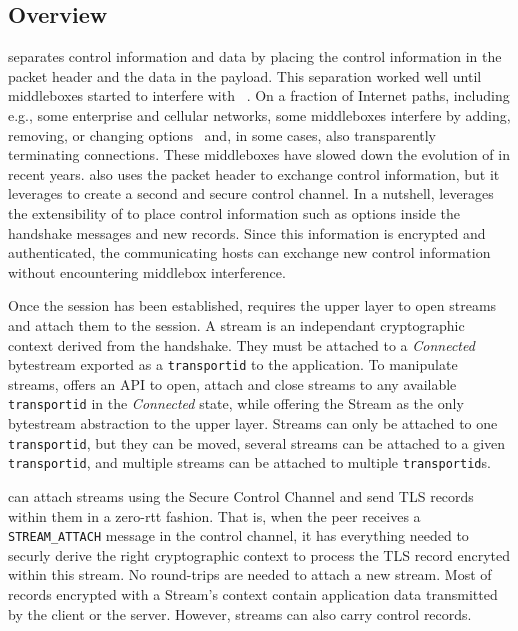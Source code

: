 \subsection{Overview}

\tcp separates control information and data by placing the control information
in the packet header and the data in the payload. This separation worked well
until middleboxes started to interfere with \tcp~\cite{10.1145/1064413.1064418,
  honda2011still, DHBVD13}.  On a fraction of Internet paths, including e.g.,
some enterprise and cellular networks, some middleboxes interfere by adding,
removing, or changing \tcp options~\cite{wang2011untold, honda2011still,
  xu2015investigating} and, in some cases, also transparently terminating \tcp
connections. These middleboxes have slowed down the evolution of \tcp in recent
years. \tcpls also uses the packet header to exchange \tcp control information,
but it leverages \tls to create a second and secure control channel. In a
nutshell, \tcpls leverages the extensibility of  to place control
information such as \tcp options inside the \tls handshake messages and new \tls
records. Since this information is encrypted and authenticated, the
communicating hosts can exchange new control information without encountering
middlebox interference.

Once the \tcpls session has been established, \tcpls requires the upper layer to
open streams and attach them to the session. A stream is an independant
cryptographic context derived from the \tcpls handshake. They must be attached to a \textit{Connected} \tcp bytestream exported as a \texttt{transportid} to the application. To manipulate streams, \tcpls offers an API to open, attach
and close streams to any available \texttt{transportid} in the \textit{Connected} state, while offering the Stream as the only bytestream abstraction to the upper layer. Streams can only be attached to one \texttt{transportid}, but they can be moved, several streams can be attached to a given \texttt{transportid}, and multiple streams can be attached to multiple \texttt{transportid}s.

\tcpls can attach streams using the Secure Control Channel and send TLS records
within them in a zero-rtt fashion. That is, when the peer receives a
\texttt{STREAM\_ATTACH} message in the control channel, it has everything needed
to securly derive the right cryptographic context to process the TLS record
encryted within this stream. No round-trips are needed to attach a new stream.
Most of records encrypted with a Stream's context contain application data
transmitted by the client or the server. However, streams can also carry control
records.

